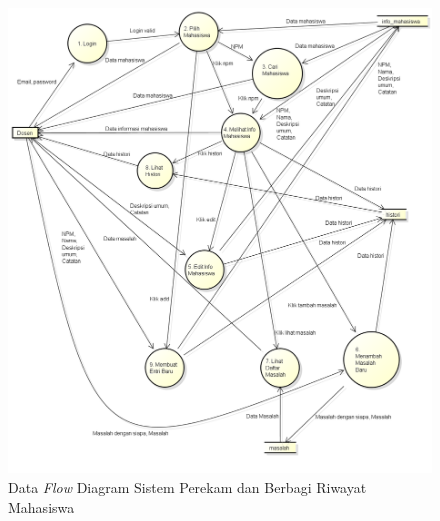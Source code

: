 \begin{enumerate}[(1)]
\begin{figure}[p]
\centering
\includegraphics[scale=0.49]{Gambar/dfdl1.png}
\caption[Data {\it Flow} Diagram Sistem Perekam dan Berbagi Riwayat Mahasiswa]{Data {\it Flow}
Diagram Sistem Perekam dan Berbagi Riwayat Mahasiswa}
\label{fig:dfdl1}
\end{figure}


\end{enumerate}
